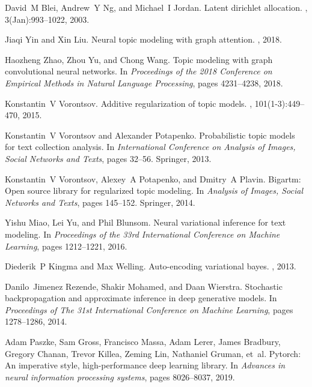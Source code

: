 \documentclass{article}
\begin{document}
\begin{thebibliography}{20}

David~M Blei, Andrew~Y Ng, and Michael~I Jordan.
\newblock Latent dirichlet allocation.
, 3(Jan):993--1022, 2003.

Jiaqi Yin and Xin Liu.
\newblock Neural topic modeling with graph attention.
, 2018.

Haozheng Zhao, Zhou Yu, and Chong Wang.
\newblock Topic modeling with graph convolutional neural networks.
\newblock In {\em Proceedings of the 2018 Conference on Empirical Methods in Natural Language Processing}, pages 4231--4238, 2018.

Konstantin~V Vorontsov.
\newblock Additive regularization of topic models.
, 101(1-3):449--470, 2015.

Konstantin~V Vorontsov and Alexander Potapenko.
\newblock Probabilistic topic models for text collection analysis.
\newblock In {\em International Conference on Analysis of Images, Social Networks and Texts}, pages 32--56. Springer, 2013.

Konstantin~V Vorontsov, Alexey~A Potapenko, and Dmitry~A Plavin.
\newblock Bigartm: Open source library for regularized topic modeling.
\newblock In {\em Analysis of Images, Social Networks and Texts}, pages 145--152. Springer, 2014.

Yishu Miao, Lei Yu, and Phil Blunsom.
\newblock Neural variational inference for text modeling.
\newblock In {\em Proceedings of the 33rd International Conference on Machine Learning}, pages 1212--1221, 2016.

Diederik~P Kingma and Max Welling.
\newblock Auto-encoding variational bayes.
, 2013.

Danilo~Jimenez Rezende, Shakir Mohamed, and Daan Wierstra.
\newblock Stochastic backpropagation and approximate inference in deep generative models.
\newblock In {\em Proceedings of The 31st International Conference on Machine Learning}, pages 1278--1286, 2014.

Adam Paszke, Sam Gross, Francisco Massa, Adam Lerer, James Bradbury, Gregory Chanan, Trevor Killea, Zeming Lin, Nathaniel
  Gruman, et~al.
\newblock Pytorch: An imperative style, high-performance deep learning library.
\newblock In {\em Advances in neural information processing systems}, pages 8026--8037, 2019.


\end{thebibliography}
\end{document}
